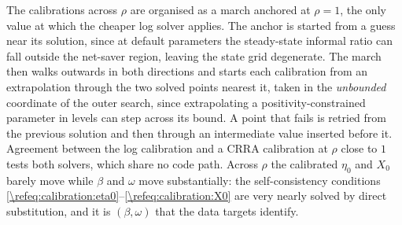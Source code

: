 The calibrations across $\rho$ are organised as a march anchored at $\rho=1$, the only value at which the cheaper log solver applies. The anchor is started from a guess near its solution, since at default parameters the steady-state informal ratio can fall outside the net-saver region, leaving the state grid degenerate. The march then walks outwards in both directions and starts each calibration from an extrapolation through the two solved points nearest it, taken in the \emph{unbounded} coordinate of the outer search, since extrapolating a positivity-constrained parameter in levels can step across its bound. A point that fails is retried from the previous solution and then through an intermediate value inserted before it. Agreement between the log calibration and a CRRA calibration at $\rho$ close to $1$ tests both solvers, which share no code path. Across $\rho$ the calibrated $\eta_0$ and $X_0$ barely move while $\beta$ and $\omega$ move substantially: the self-consistency conditions \eqref{\refeq:calibration:eta0}--\eqref{\refeq:calibration:X0} are very nearly solved by direct substitution, and it is $\left(\beta,\omega\right)$ that the data targets identify.
